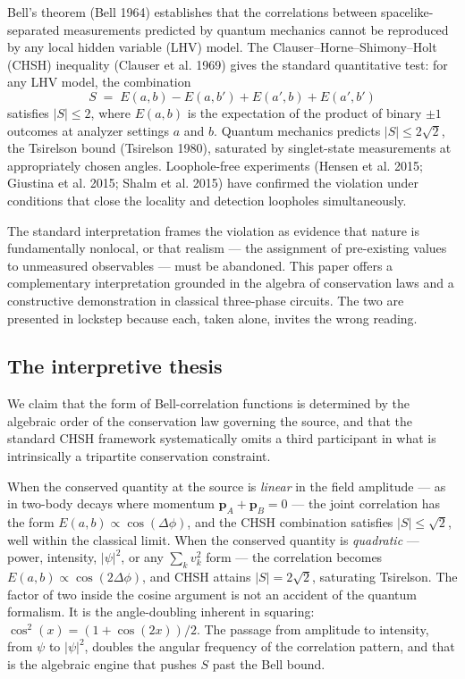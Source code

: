 \documentclass[
  11pt]{article}
\begin{document}
Bell's theorem (Bell 1964) establishes that the correlations between
spacelike-separated measurements predicted by quantum mechanics cannot
be reproduced by any local hidden variable (LHV) model. The
Clauser--Horne--Shimony--Holt (CHSH) inequality (Clauser et al. 1969)
gives the standard quantitative test: for any LHV model, the combination
\[
S \;=\; E(a,b) - E(a,b') + E(a',b) + E(a',b')
\] satisfies \(|S| \leq 2\), where \(E(a,b)\) is the expectation of the
product of binary \(\pm 1\) outcomes at analyzer settings \(a\) and
\(b\). Quantum mechanics predicts \(|S| \leq 2\sqrt{2}\), the Tsirelson
bound (Tsirelson 1980), saturated by singlet-state measurements at
appropriately chosen angles. Loophole-free experiments (Hensen et al.
2015; Giustina et al. 2015; Shalm et al. 2015) have confirmed the
violation under conditions that close the locality and detection
loopholes simultaneously.

The standard interpretation frames the violation as evidence that nature
is fundamentally nonlocal, or that realism --- the assignment of
pre-existing values to unmeasured observables --- must be abandoned.
This paper offers a complementary interpretation grounded in the algebra
of conservation laws and a constructive demonstration in classical
three-phase circuits. The two are presented in lockstep because each,
taken alone, invites the wrong reading.

\subsection{The interpretive thesis}\label{the-interpretive-thesis}

We claim that the form of Bell-correlation functions is determined by
the algebraic order of the conservation law governing the source, and
that the standard CHSH framework systematically omits a third
participant in what is intrinsically a tripartite conservation
constraint.

When the conserved quantity at the source is \emph{linear} in the field
amplitude --- as in two-body decays where momentum
\(\mathbf{p}_A + \mathbf{p}_B = 0\) --- the joint correlation has the
form \(E(a,b) \propto \cos(\Delta\phi)\), and the CHSH combination
satisfies \(|S| \leq \sqrt{2}\), well within the classical limit. When
the conserved quantity is \emph{quadratic} --- power, intensity,
\(|\psi|^2\), or any \(\sum_k v_k^2\) form --- the correlation becomes
\(E(a,b) \propto \cos(2\Delta\phi)\), and CHSH attains
\(|S| = 2\sqrt{2}\), saturating Tsirelson. The factor of two inside the
cosine argument is not an accident of the quantum formalism. It is the
angle-doubling inherent in squaring: \(\cos^2(x) = (1 + \cos(2x))/2\).
The passage from amplitude to intensity, from \(\psi\) to \(|\psi|^2\),
doubles the angular frequency of the correlation pattern, and that is
the algebraic engine that pushes \(S\) past the Bell bound.
\end{document}
